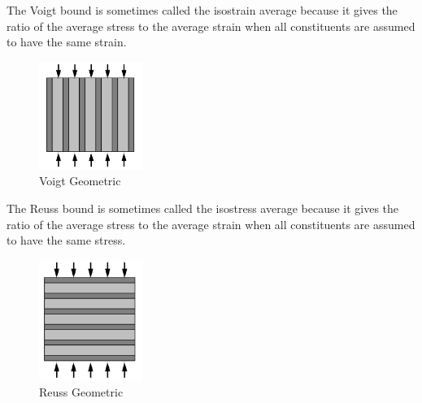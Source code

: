 \begin{solution}

    The Voigt bound is sometimes called the isostrain average because it gives the 
    ratio of the average stress to the average strain when all constituents are 
    assumed to have the same strain.
    \begin{figure}[H]
        \centering
        \includegraphics[width=0.3\textwidth]{figures/homework-1/Voigt-geometric.jpg}
        \caption{Voigt Geometric}
        \label{fig:Voigt-geometric}
    \end{figure}

    The Reuss bound is sometimes called the isostress average because it gives the 
    ratio of the average stress to the average strain when all constituents are 
    assumed to have the same stress.
    \begin{figure}[H]
        \centering
        \includegraphics[width=0.3\textwidth]{figures/homework-1/Reuss-geometric.jpg}
        \caption{Reuss Geometric}
        \label{fig:Reuss-geometric}
    \end{figure}


\end{solution}
